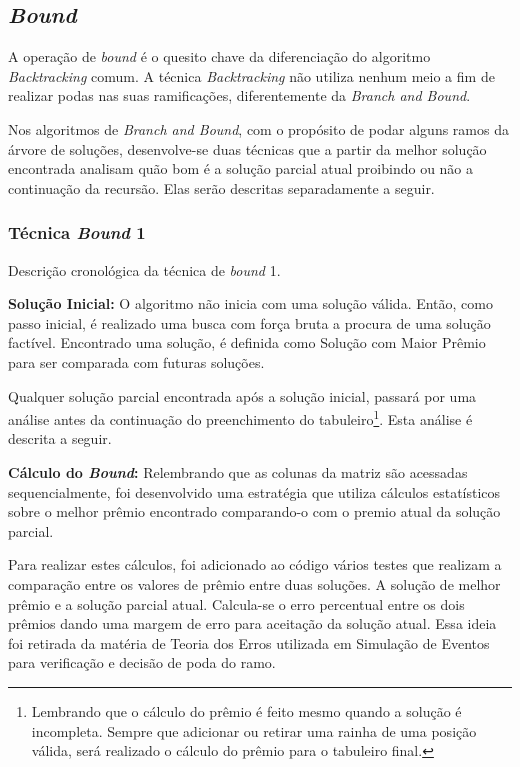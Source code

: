 \documentclass[12pt]{article}
\begin{document}
	\subsection{\textit{Bound}} \label{sec:bound}
		A operação de \textit{bound} é o quesito chave da diferenciação do algoritmo \textit{Backtracking} comum. A técnica \textit{Backtracking} não utiliza nenhum meio a fim de realizar podas nas suas ramificações, diferentemente da \textit{Branch and Bound}.

		Nos algoritmos de \textit{Branch and Bound}, com o propósito de podar alguns ramos da árvore de soluções, desenvolve-se duas técnicas que a partir da melhor solução encontrada analisam quão bom é a solução parcial atual proibindo ou não a continuação da recursão. Elas serão descritas separadamente a seguir.

		\subsubsection{Técnica \textit{Bound} 1} \label{sec:tec1}
			Descrição cronológica da técnica de \textit{bound} 1.

			\textbf{Solução Inicial:} O algoritmo não inicia com uma solução válida. Então, como passo inicial, é realizado uma busca com força bruta a procura de uma solução factível. Encontrado uma solução, é definida como Solução com Maior Prêmio para ser comparada com futuras soluções.

			Qualquer solução parcial encontrada após a solução inicial, passará por uma análise antes da continuação do preenchimento do tabuleiro\footnote{Lembrando que o cálculo do prêmio é feito mesmo quando a solução é incompleta. Sempre que adicionar ou retirar uma rainha de uma posição válida, será realizado o cálculo do prêmio para o tabuleiro final.}. Esta análise é descrita a seguir.


			\textbf{Cálculo do \textit{Bound}:} Relembrando que as colunas da matriz são acessadas sequencialmente, foi desenvolvido uma estratégia que utiliza cálculos estatísticos sobre o melhor prêmio encontrado comparando-o com o premio atual da solução parcial.

			Para realizar estes cálculos, foi adicionado ao código vários testes que realizam a comparação entre os valores de prêmio entre duas soluções. A solução de melhor prêmio e a solução parcial atual. Calcula-se o erro percentual entre os dois prêmios dando uma margem de erro para aceitação da solução atual. Essa ideia foi retirada da matéria de Teoria dos Erros utilizada em Simulação de Eventos para verificação e decisão de poda do ramo.
\end{document}
